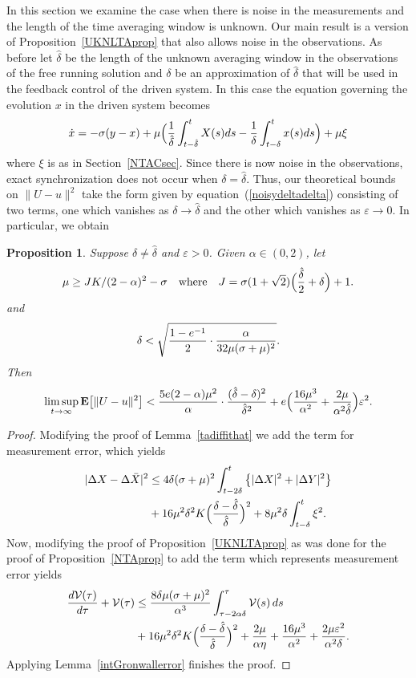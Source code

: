 \documentclass[master,tocprelim,12pt]{unrthesis}
\newtheorem{proposition}{Proposition}[chapter]
\theoremstyle{definition}
\newcommand{\cV}{{\mathcal V}}
\def\words#1{\quad\hbox{#1}\quad}
\numberwithin{equation}{chapter}
\begin{document}
\begin{manuscript}
In this section we examine the case when there is noise in
the measurements and the length of the time averaging window 
is unknown.  
Our main result is a version of Proposition~\ref{UKNLTAprop}
that also allows noise in the observations.
As before let $\hat\delta$ be the length of the unknown averaging
window in the observations of the free running solution and
$\delta$ be an approximation of $\hat\delta$ that will be used 
in the feedback control of the driven system.
In this case the equation governing the evolution $x$ in the driven system
becomes
$$
    \dot{x} = -\sigma(y-x)+\mu
        \Big(
        {1\over\hat\delta}\int_{t-\hat\delta}^t X(s)ds
        -{1\over\delta}\int_{t-\delta}^t x(s)ds
    \Big) + \mu\xi
$$
where $\xi$ is as in Section~\ref{NTACsec}.
Since there is now noise in the observations, exact synchronization does 
not occur when $\delta=\hat\delta$.  Thus, our theoretical bounds
on $\|U-u\|^2$ take the form given by equation~(\ref{noisydeltadelta}) consisting
of two terms, one which vanishes as $\delta\to\hat\delta$ and
the other which vanishes as $\varepsilon\to 0$.
In particular, we obtain

\begin{proposition}\label{UKNTAprop}
Suppose $\delta\ne\hat\delta$ and $\varepsilon>0$.
Given $\alpha\in(0,2)$,
let 
$$\mu \ge JK/(2-\alpha)^2-\sigma
\words{where}
		J={\sigma(1+\sqrt 2)}
        \Big({\hat\delta\over 2} +\delta\Big)+1.
$$ 
and 
$$  \delta<
    \sqrt{{1-e^{-1}\over 2}\cdot {\alpha\over 32\mu(\sigma+\mu)^2}}.$$
Then $$\limsup_{t\to\infty}{\bf E}\big[\|U-u\|^2 \big]
< {5e(2-\alpha)\mu^2\over \alpha}\cdot
{(\hat\delta-\delta)^2\over\hat{\delta}^2}
	+
    e\Big({16\mu^3\over\alpha^2} +{2\mu\over\alpha^2\hat\delta}\Big)\varepsilon^2.
$$
\end{proposition}

\begin{proof}
Modifying the proof of Lemma~\ref{tadiffithat}
we add the term for measurement error, which yields
\begin{align*}
	|\Delta X-\Delta\bar X|^2
		&\le
		4\delta(\sigma+\mu)^2
		\int_{t-2\delta}^t \big\{|\Delta X|^2+|\Delta Y|^2\big\}\\
		&+16 \mu^2\delta^2 K \Big({\delta-\hat\delta\over\hat\delta}\Big)^2
		+8\mu^2\delta\int_{t-\delta}^t\xi^2.
\end{align*}
Now, modifying the proof of Proposition~\ref{UKNLTAprop} as was done
for the proof of Proposition~\ref{NTAprop} to add the term which
represents measurement error yields 
\begin{align*}
    {d\cV(\tau)\over d\tau}
+ \cV(\tau)
    &\leq
        {8\delta\mu (\sigma + \mu)^2\over \alpha^3}
        \int_{\tau-2\alpha\delta}^\tau \cV(s)\,ds\\
		&+16 \mu^2\delta^2 K \Big({\delta-\hat\delta\over\hat\delta}\Big)^2
			+{2\mu\over\alpha\eta} 
            +{16\mu^3 \over \alpha^2}
	+ {2\mu\varepsilon^2\over \alpha^2\delta}.
\end{align*}
Applying Lemma~\ref{intGronwallerror} 
finishes the proof.
\end{proof}



\end{manuscript}
\end{document}
